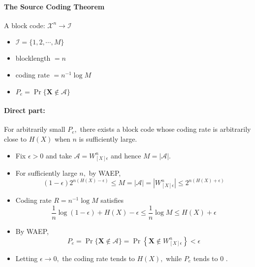 \documentclass[8pt]{article}
\begin{document}
\paragraph{The Source Coding Theorem} A block code: $\mathcal{X}^{n} \rightarrow \mathcal{I}$
\begin{itemize}
	\item $\mathcal{I}=\{1,2, \cdots, M\}$
	\item blocklength $=n$
	\item coding rate $=n^{-1} \log M$
	\item $P_{e}=\operatorname{Pr}\{\mathbf{X} \notin \mathcal{A}\}$
\end{itemize}
\paragraph{Direct part:} For arbitrarily small $P_{e},$ there exists a block code whose coding rate is arbitrarily close to $H(X)$ when $n$ is sufficiently large.
\begin{itemize}
	\item Fix $\epsilon>0$ and take $\mathcal{A}=W_{[X] \epsilon}^{n}$ and hence $M=|\mathcal{A}|$.
	\item For sufficiently large $n,$ by WAEP,
	$$
	(1-\epsilon) 2^{n(H(X)-\epsilon)} \leq M=|\mathcal{A}|=\left|W_{[X] \epsilon}^{n}\right| \leq 2^{n(H(X)+\epsilon)}
	$$
	\item Coding rate $R =n^{-1} \log M$ satisfies
	$$
	\frac{1}{n} \log (1-\epsilon)+H(X)-\epsilon \leq \frac{1}{n} \log M \leq H(X)+\epsilon
	$$
	\item By WAEP,
	$$
	P_{e}=\operatorname{Pr}\{\mathbf{X} \notin \mathcal{A}\}=\operatorname{Pr}\left\{\mathbf{X} \notin W_{[X] \epsilon}^{n}\right\}<\epsilon
	$$
	\item Letting $\epsilon \rightarrow 0,$ the coding rate tends to $H(X),$ while $P_{e}$ tends to 0 .
\end{itemize}
\end{document}
